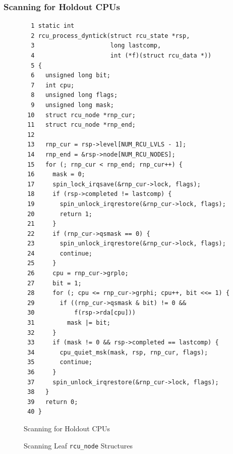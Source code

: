 \subsubsection{Scanning for Holdout CPUs}
\label{app:rcuimpl:rcutreewt:Scanning for Holdout CPUs}

\begin{figure}[tbp]
{ \scriptsize
\begin{verbatim}
  1 static int
  2 rcu_process_dyntick(struct rcu_state *rsp,
  3                     long lastcomp,
  4                     int (*f)(struct rcu_data *))
  5 {
  6   unsigned long bit;
  7   int cpu;
  8   unsigned long flags;
  9   unsigned long mask;
 10   struct rcu_node *rnp_cur;
 11   struct rcu_node *rnp_end;
 12
 13   rnp_cur = rsp->level[NUM_RCU_LVLS - 1];
 14   rnp_end = &rsp->node[NUM_RCU_NODES];
 15   for (; rnp_cur < rnp_end; rnp_cur++) {
 16     mask = 0;
 17     spin_lock_irqsave(&rnp_cur->lock, flags);
 18     if (rsp->completed != lastcomp) {
 19       spin_unlock_irqrestore(&rnp_cur->lock, flags);
 20       return 1;
 21     }
 22     if (rnp_cur->qsmask == 0) {
 23       spin_unlock_irqrestore(&rnp_cur->lock, flags);
 24       continue;
 25     }
 26     cpu = rnp_cur->grplo;
 27     bit = 1;
 28     for (; cpu <= rnp_cur->grphi; cpu++, bit <<= 1) {
 29       if ((rnp_cur->qsmask & bit) != 0 &&
 30           f(rsp->rda[cpu]))
 31         mask |= bit;
 32     }
 33     if (mask != 0 && rsp->completed == lastcomp) {
 34       cpu_quiet_msk(mask, rsp, rnp_cur, flags);
 35       continue;
 36     }
 37     spin_unlock_irqrestore(&rnp_cur->lock, flags);
 38   }
 39   return 0;
 40 }
\end{verbatim}
}
\caption{Scanning for Holdout CPUs}
\label{fig:app:rcuimpl:rcutreewt:Scanning for Holdout CPUs}
\end{figure}

\begin{figure}[tb]
\begin{center}
\end{center}
\caption{Scanning Leaf {\tt rcu\_node} Structures}
\label{fig:app:rcuimpl:rcutree:Scanning Leaf rcu-node Structures}
\end{figure}

